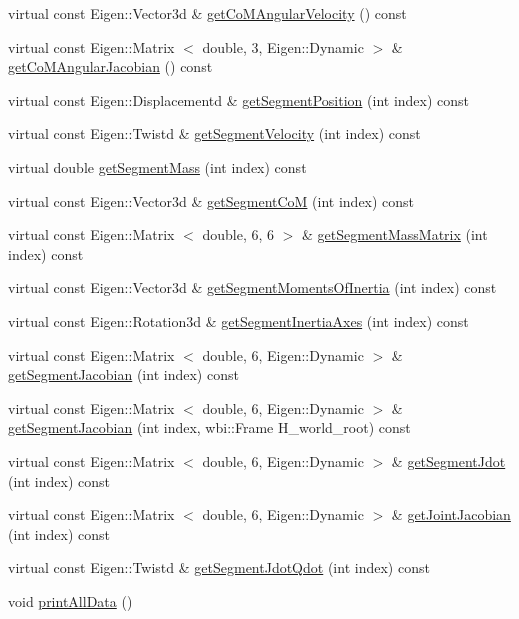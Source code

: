 \begin{DoxyCompactItemize}
\item 
virtual const \-Eigen\-::\-Vector3d \& \hyperlink{classocra__icub_1_1OcraWbiModel_a98c163c5f051c36b78ff24810421664c}{get\-Co\-M\-Angular\-Velocity} () const 
\item 
virtual const \-Eigen\-::\-Matrix\*
$<$ double, 3, \-Eigen\-::\-Dynamic $>$ \& \hyperlink{classocra__icub_1_1OcraWbiModel_aede9be679109798e7342351d13ffdfcd}{get\-Co\-M\-Angular\-Jacobian} () const 
\item 
virtual const \*
\-Eigen\-::\-Displacementd \& \hyperlink{classocra__icub_1_1OcraWbiModel_ad6b33c312d04c4bba05e0df67d8bae06}{get\-Segment\-Position} (int index) const 
\item 
virtual const \-Eigen\-::\-Twistd \& \hyperlink{classocra__icub_1_1OcraWbiModel_a273d90e5ad6d3c1e849b996b1cfc1860}{get\-Segment\-Velocity} (int index) const 
\item 
virtual double \hyperlink{classocra__icub_1_1OcraWbiModel_a2d04857d60138f1664b7828e0d3a307d}{get\-Segment\-Mass} (int index) const 
\item 
virtual const \-Eigen\-::\-Vector3d \& \hyperlink{classocra__icub_1_1OcraWbiModel_a2e2dc6611ff436dcd09ba979197e712d}{get\-Segment\-Co\-M} (int index) const 
\item 
virtual const \-Eigen\-::\-Matrix\*
$<$ double, 6, 6 $>$ \& \hyperlink{classocra__icub_1_1OcraWbiModel_af5849bc569b86523cf515a031b5e14a7}{get\-Segment\-Mass\-Matrix} (int index) const 
\item 
virtual const \-Eigen\-::\-Vector3d \& \hyperlink{classocra__icub_1_1OcraWbiModel_a383b0fc03ffb220899aba6b25fcb6272}{get\-Segment\-Moments\-Of\-Inertia} (int index) const 
\item 
virtual const \-Eigen\-::\-Rotation3d \& \hyperlink{classocra__icub_1_1OcraWbiModel_ad9f9d9013433b1bbf5a59914bee38b14}{get\-Segment\-Inertia\-Axes} (int index) const 
\item 
virtual const \-Eigen\-::\-Matrix\*
$<$ double, 6, \-Eigen\-::\-Dynamic $>$ \& \hyperlink{classocra__icub_1_1OcraWbiModel_a5f0aa99b6b6e85b465ad3a5238caeb9d}{get\-Segment\-Jacobian} (int index) const 
\item 
virtual const \-Eigen\-::\-Matrix\*
$<$ double, 6, \-Eigen\-::\-Dynamic $>$ \& \hyperlink{classocra__icub_1_1OcraWbiModel_a5c556d66e590314fa6c44ceb8658d540}{get\-Segment\-Jacobian} (int index, wbi\-::\-Frame \-H\-\_\-world\-\_\-root) const 
\item 
virtual const \-Eigen\-::\-Matrix\*
$<$ double, 6, \-Eigen\-::\-Dynamic $>$ \& \hyperlink{classocra__icub_1_1OcraWbiModel_a0c391aaf9a10840346b35952e89e32fc}{get\-Segment\-Jdot} (int index) const 
\item 
virtual const \-Eigen\-::\-Matrix\*
$<$ double, 6, \-Eigen\-::\-Dynamic $>$ \& \hyperlink{classocra__icub_1_1OcraWbiModel_a4dd0a4cd9f8d710c64e67c0336169321}{get\-Joint\-Jacobian} (int index) const 
\item 
virtual const \-Eigen\-::\-Twistd \& \hyperlink{classocra__icub_1_1OcraWbiModel_a3261757fab0ab980f8b92748bf5d350e}{get\-Segment\-Jdot\-Qdot} (int index) const 
\item 
void \hyperlink{classocra__icub_1_1OcraWbiModel_a309b3554c4eefda46c05b766476f40fb}{print\-All\-Data} ()
\end{DoxyCompactItemize}
